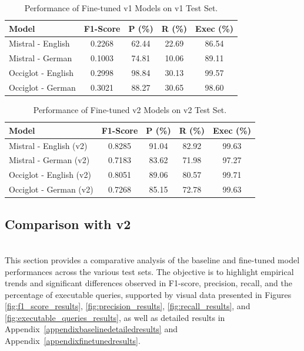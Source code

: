 \begin{table}[htbp]
\centering
\caption{Performance of Fine-tuned v1 Models on v1 Test Set.}
\label{tab:finetuned_v1_testset}
\begin{tabular}{@{}lcccc@{}}
\toprule
\textbf{Model} & \textbf{F1-Score} & \textbf{P (\%)} & \textbf{R (\%)} & \textbf{Exec (\%)} \\
\midrule
Mistral - English & 0.2268 & 62.44 & 22.69 & 86.54 \\
Mistral - German  & 0.1003 & 74.81 & 10.06 & 89.11 \\
Occiglot - English& 0.2998 & 98.84 & 30.13 & 99.57 \\
Occiglot - German & 0.3021 & 88.27 & 30.65 & 98.60 \\
\bottomrule
\end{tabular}
\end{table}

\begin{table}[htbp]
\centering
\caption{Performance of Fine-tuned v2 Models on v2 Test Set.}
\label{tab:finetuned_v2_testset}
\begin{tabular}{@{}lcccc@{}}
\toprule
\textbf{Model} & \textbf{F1-Score} & \textbf{P (\%)} & \textbf{R (\%)} & \textbf{Exec (\%)} \\
\midrule
Mistral - English (v2) & 0.8285 & 91.04 & 82.92 & 99.63 \\
Mistral - German (v2)  & 0.7183 & 83.62 & 71.98 & 97.27 \\
Occiglot - English (v2)& 0.8051 & 89.06 & 80.57 & 99.71 \\
Occiglot - German (v2) & 0.7268 & 85.15 & 72.78 & 99.63 \\
\bottomrule
\end{tabular}
\end{table}

\subsection{Comparison with v2}\label{sec:comparison_results}\mbox{}\\
This section provides a comparative analysis of the baseline and fine-tuned model performances across the various test sets. The objective is to highlight empirical trends and significant differences observed in F1-score, precision, recall, and the percentage of executable queries, supported by visual data presented in Figures \ref{fig:f1_score_results}, \ref{fig:precision_results}, \ref{fig:recall_results}, and \ref{fig:executable_queries_results}, as well as detailed results in Appendix~\ref{appendixbaselinedetailedresults} and Appendix~\ref{appendixfinetunedresults}.


